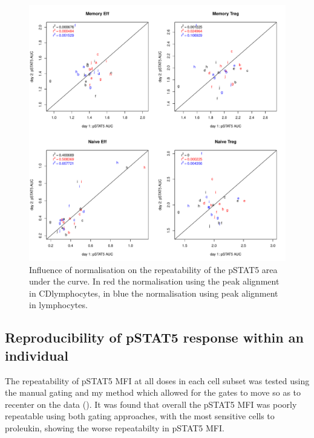 \begin{figure}[h]
    \centering
    \includegraphics[scale=.5]{IL2/figures/pstat5-auc-repeatability-celltypes.pdf}
    { Influence of normalisation on the repeatability of the pSTAT5 area under the curve. }
    { In red the normalisation using the peak alignment in CD\positive lymphocytes, in blue the normalisation using peak alignment in lymphocytes. }
\end{figure}

\subsection{Reproducibility of pSTAT5 response within an individual}

The repeatability of pSTAT5 MFI at all doses in each cell subset was tested using the manual gating and my method which allowed for
the gates to move so as to recenter on the data ().
It was found that overall the pSTAT5 MFI was poorly repeatable using both gating approaches,
with the most sensitive cells to proleukin, showing the worse repeatabilty in pSTAT5 MFI.

